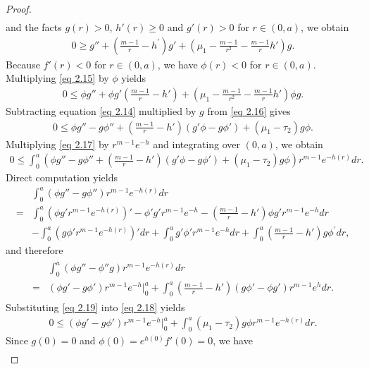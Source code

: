 \documentclass[11pt,leqno]{amsart}
\numberwithin{equation}{section}
\begin{document}
\begin{proof}
\begin{align*}
\end{align*}
and the facts $g(r)>0$,  $h'(r)\ge 0$ and $g'(r)>0$ for $r\in (0,a)$, we obtain
\begin{align}\label{eq 2.15}
    0\geq  g''+(\frac{m-1}{r}-h^{'})g'+(\mu_{1}-\frac{m-1}{r^{2}}-\frac{m-1}{r}h') g.
\end{align}
Because $f'(r)<0$ for $r\in (0,a)$, we have $\phi(r)<0$ for $r\in(0, a)$. Multiplying \eqref{eq 2.15} by $\phi$  yields
\begin{align}\label{eq 2.16}
    0\leq \phi g''+\phi g'(\frac{m-1}{r}-h')+(\mu_{1}-\frac{m-1}{r^{2}}-\frac{m-1}{r}h') \phi g.
\end{align}
Subtracting equation \eqref{eq 2.14} multiplied by  $g$
from \eqref{eq 2.16} gives
\begin{align}\label{eq 2.17}
    0\leq \phi g''-g\phi''+(\frac{m-1}{r}-h')(g'\phi-g\phi')+(\mu_{1}-\tau_{2})g\phi.
\end{align}
Multiplying \eqref{eq 2.17} by $r^{m-1}e^{-h}$ and integrating over $(0,a)$, we obtain
\begin{align}\label{eq 2.18}
    0\leq \int_{0}^{a}(\phi g''-g\phi''+(\frac{m-1}{r}-h')(g'\phi-g\phi')+(\mu_{1}-\tau_{2})g\phi)r^{m-1}e^{-h(r)}dr.
\end{align}
Direct computation yields
\begin{align*}
   & \int_{0}^{a}(\phi g''-g\phi'')r^{m-1}e^{-h(r)}dr\\
    =&\int_{0}^{a}(\phi g'r^{m-1}e^{-h(r)})'-\phi'g'r^{m-1}e^{-h}-(\frac{m-1}{r}-h')\phi g'r^{m-1}e^{-h}dr\\
    &-\int_{0}^{a}(g\phi'r^{m-1}e^{-h(r)})'dr+\int_{0}^{a}g'\phi'r^{m-1}e^{-h}dr+\int_{0}^{a}(\frac{m-1}{r}-h')g\phi^{'}dr,
\end{align*}
and therefore
\begin{align}\label{eq 2.19}
\begin{split}
       &\int_{0}^{a}(\phi g''-\phi''g)r^{m-1}e^{-h(r)}dr\\
    =&(\phi g'-g\phi')r^{m-1}e^{-h}\Big|_{0}^{a}+\int_{0}^{a}(\frac{m-1}{r}-h')(g\phi'-\phi g')r^{m-1}e^{h}dr. 
\end{split}
\end{align}
Substituting \eqref{eq 2.19} into  \eqref{eq 2.18} yields 
\begin{align}\label{eq 2.20}
    0\leq (\phi g'-g\phi')r^{m-1}e^{-h}\Big|_{0}^{a}+\int_{0}^{a}(\mu_{1}-\tau_{2})g\phi r^{m-1}e^{-h(r)}dr.
\end{align}
Since $g(0)=0$ and $\phi(0)=e^{h(0)}f'(0)=0$, we have 
\begin{align*}

\end{align*}
\end{proof}
\end{document}

